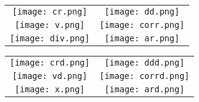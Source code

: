 \documentclass[6pt]{article}
\begin{document}
\centering

\begin{tabular}{cc}
  \texttt{[image: cr.png]} & \texttt{[image: dd.png]} \\
  \texttt{[image: v.png]} & \texttt{[image: corr.png]} \\
  \texttt{[image: div.png]} & \texttt{[image: ar.png]} \\
\end{tabular} 
\newpage
\begin{tabular}{cc}
  \texttt{[image: crd.png]} & \texttt{[image: ddd.png]} \\
  \texttt{[image: vd.png]} & \texttt{[image: corrd.png]} \\
  \texttt{[image: x.png]} & \texttt{[image: ard.png]} \\
\end{tabular} 
\end{document}
